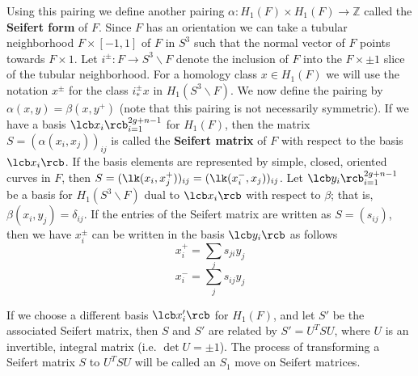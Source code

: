 Using this pairing we define another pairing $\alpha : H_1(F) \times H_1(F) \rightarrow \mathbb Z$ called the \textbf{Seifert form} of $F$. Since $F$ has an orientation we can take a tubular neighborhood $F \times [-1,1]$ of $F$ in $S^3$ such that the normal vector of $F$ points towards $F \times 1$. Let $i^\pm : F \rightarrow S^3 \backslash F$ denote the inclusion of $F$ into the $F \times \pm 1$ slice of the tubular neighborhood. For a homology class $x \in H_1(F)$ we will use the notation $x^\pm$ for the class $i_*^\pm x$ in $H_1(S^3 \backslash F)$. We now define the pairing by $\alpha(x,y) = \beta(x,y^+)$ (note that this pairing is not necessarily symmetric). If we have a basis $\lcb x_i \rcb_{i=1}^{2g+n-1}$ for $H_1(F)$, then the matrix $S = (\alpha(x_i,x_j))_{ij}$ is called the \textbf{Seifert matrix} of $F$ with respect to the basis $\lcb x_i \rcb$. If the basis elements are represented by simple, closed, oriented curves in $F$, then $S = (\lk(x_i,x_j^+))_{ij} = (\lk(x_i^-,x_j))_{ij}$. Let $\lcb y_i \rcb_{i=1}^{2g+n-1}$ be a basis for $H_1(S^3 \backslash F)$ dual to $\lcb x_i \rcb$ with respect to $\beta$; that is, $\beta(x_i,y_j) = \delta_{ij}$. If the entries of the Seifert matrix are written as $S = (s_{ij})$, then we have $x_i^\pm$ can be written in the basis $\lcb y_i \rcb$ as follows
\begin{equation}
\label{x_i^+ in y basis}
x_i^+ = \sum_j s_{ji} y_j
\end{equation}
\begin{equation}
\label{x_i^+- in y basis}
x_i^- = \sum_j s_{ij} y_j
\end{equation}

If we choose a different basis $\lcb x_i' \rcb$ for $H_1(F)$, and let $S'$ be the associated Seifert matrix, then $S$ and $S'$ are related by $S' = U^T S U$, where $U$ is an invertible, integral matrix (i.e. $\det U = \pm 1$). The process of transforming a Seifert matrix $S$ to $U^T S U$ will be called an $S_1$ move on Seifert matrices.

